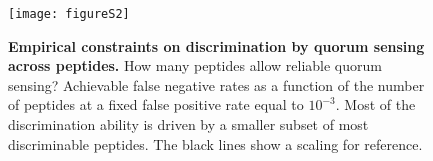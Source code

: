 \documentclass[superscriptaddress,twocolumn,pre]{revtex4}
\newcommand{\<}{\langle}
\renewcommand{\>}{\rangle}
\begin{document}
\begin{figure}
     \texttt{[image: figureS2]}
     \caption{
         {\bf Empirical constraints on discrimination by quorum sensing across peptides.}
        How many peptides allow reliable quorum sensing? Achievable false negative rates as a function of the number of peptides at a fixed false positive rate equal to $10^{-3}$. Most of the discrimination ability is driven by a smaller subset of most discriminable peptides. The black lines show a  scaling for reference.
     \label{figureS2}
     }
\end{figure}






\end{document}
